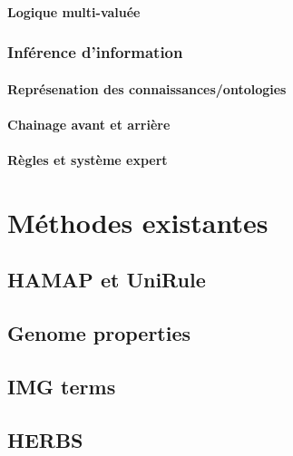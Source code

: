 \begin{refsection}
    \paragraph{Logique multi-valuée}
    \subsubsection{Inférence d’information}
    \paragraph{Représenation des connaissances/ontologies}
    \paragraph{Chainage avant et arrière} %
    \paragraph{Règles et système expert}
    
    \section{Méthodes existantes}
    \subsection{HAMAP et UniRule}
    \subsection{Genome properties}
    \subsection{IMG terms}
    \subsection{HERBS}
    
    \subbibliography
\end{refsection}